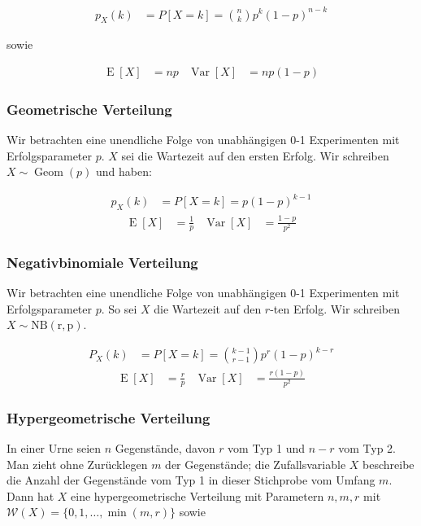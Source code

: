 \documentclass[25pt]{sciposter}
\newcommand{\W}{\mathcal{W}}
\newcommand{\Var}{\operatorname{Var}}
\newcommand{\E}{\operatorname{E}}
\begin{document}
\begin{multicols}{3}
\begin{align*}
	p_X(k) &= P[X=k] = {n \choose k} p^k (1-p)^{n-k}
\end{align*}

sowie 

\begin{align*}
	\E[X] &= np & \Var[X] &= np(1-p)
\end{align*}


\subsubsection*{Geometrische Verteilung}
Wir betrachten eine unendliche Folge von unabhängigen 0-1 Experimenten mit Erfolgsparameter $p$. $X$ sei die Wartezeit auf den ersten Erfolg. Wir schreiben $X\sim\operatorname{Geom}(p)$ und haben:

\begin{align*}
	p_X(k) &= P[X=k] = p(1-p)^{k-1}
\end{align*}
\begin{align*}
	\E[X] &= \frac{1}{p} & \Var[X] &= \frac{1-p}{p^2}
\end{align*}


\subsubsection*{Negativbinomiale Verteilung}
Wir betrachten eine unendliche Folge von unabhängigen 0-1 Experimenten mit Erfolgsparameter $p$. So sei $X$ die Wartezeit auf den $r$-ten Erfolg. Wir schreiben $X\sim \operatorname{NB(r,p)}$.

\begin{align*}
	P_X(k) &= P[X = k] = {k-1 \choose r-1} p^r(1-p)^{k-r}
\end{align*}
\begin{align*}
\E[X] &= \frac{r}{p} & \Var[X] &= \frac{r(1-p)}{p^2}
\end{align*}

\subsubsection*{Hypergeometrische Verteilung}
In einer Urne seien $n$ Gegenstände, davon $r$ vom Typ 1 und $n-r$ vom Typ 2. Man
zieht ohne Zurücklegen $m$ der Gegenstände; die Zufallsvariable $X$ beschreibe die Anzahl
der Gegenstände vom Typ 1 in dieser Stichprobe vom Umfang $m$. Dann hat $X$ eine
hypergeometrische Verteilung mit Parametern $n,m,r$ mit $\W(X) = \{0, 1, \ldots, \min(m, r)\}$ sowie


\end{multicols}
\end{document}
